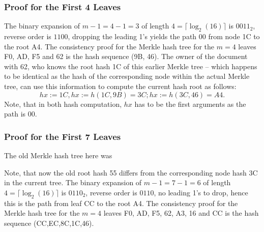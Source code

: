 \normalsize
\subsubsection{Proof for the First 4 Leaves}
The binary expansion of \(m-1=4-1=3\) of length \(4 = \lceil \log_2(16) \rceil\) is
\(0011_2\), reverse order is
\(1100\), dropping the leading 1's yields the path \(00\) from node 1C to the root A4.
The consistency proof for the Merkle hash tree for the \(m=4\) leaves F0, AD, F5 and 62
is the hash sequence (9B, 46). The owner of the document with 62, who knows the 
root hash 1C of this earlier Merkle tree -- which happens to be identical as
the hash of the corresponding node within the actual Merkle tree, can use this information
to compute the current hash root as follows:
\[hx := 1C, hx := h(1C, 9B) = 3C; hx := h(3C, 46) = A4.\] Note, that in 
both hash computation, \(hx\) has to be the first arguments as the path is 00.


\subsubsection{Proof for the First 7 Leaves}
The old Merkle hash tree here was 

\scriptsize
{}
\normalsize

Note, that now the old root hash 55 differs from the corresponding node hash 3C in the 
current tree. 
The binary expansion of \(m-1=7-1=6\) of length \(4 = \lceil \log_2(16) \rceil\) is
\(0110_2\), reverse order is
\(0110\), no leading 1's to drop, hence this is the path from leaf CC to the root A4.
The consistency proof for the Merkle hash tree for the \(m=4\) leaves F0, AD, F5, 62, 
A3, 16 and CC is the hash sequence (CC,EC,8C,1C,46).

